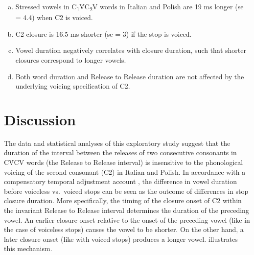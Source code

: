 \documentclass[preprint]{JASAnew}
\begin{document}
\begin{enumerate}[(a)]
  \item Stressed vowels in C\textsubscript{1}V́C\textsubscript{2}V words in Italian and Polish are 19 ms longer (se = 4.4) when C2 is voiced.
  \item C2 closure is 16.5 ms shorter (se = 3) if the stop is voiced.
  \item Vowel duration negatively correlates with closure duration, such that shorter closures correspond to longer vowels.
  \item Both word duration and Release to Release duration are not affected by the underlying voicing specification of C2.
\end{enumerate}

\section{Discussion}\label{discussion}

The data and statistical analyses of this exploratory study suggest that
the duration of the interval between the releases of two consecutive
consonants in CV́CV words (the Release to Release interval) is
insensitive to the phonological voicing of the second consonant (C2) in
Italian and Polish. In accordance with a compensatory temporal
adjustment account \citep{slis1969, lehiste1970}, the difference in
vowel duration before voiceless vs.~voiced stops can be seen as the
outcome of differences in stop closure duration. More specifically, the
timing of the closure onset of C2 within the invariant Release to
Release interval determines the duration of the preceding vowel. An
earlier closure onset relative to the onset of the preceding vowel (like
in the case of voiceless stops) causes the vowel to be shorter. On the
other hand, a later closure onset (like with voiced stops) produces a
longer vowel.  illustrates this mechanism.
\end{document}
